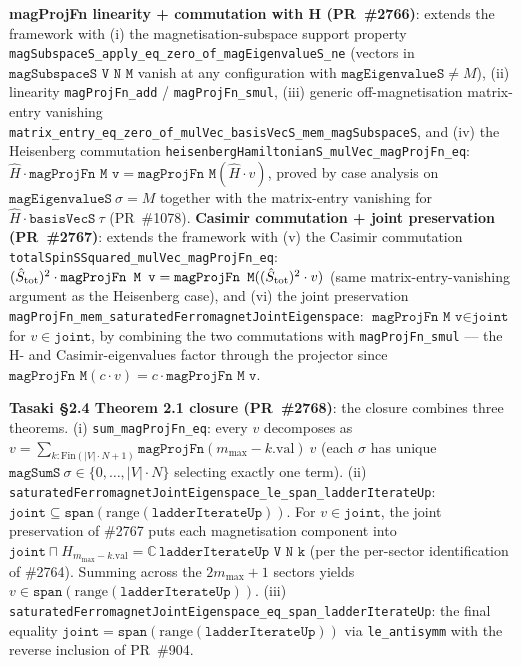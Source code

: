 \documentclass[a4paper,11pt]{article}
\begin{document}
\textbf{magProjFn linearity + commutation with H (PR~\#2766)}:
extends the framework with
(i) the magnetisation-subspace support property
\texttt{magSubspaceS\_apply\_eq\_zero\_of\_magEigenvalueS\_ne}
(vectors in $\texttt{magSubspaceS V N M}$ vanish at any
configuration with $\texttt{magEigenvalueS} \neq M$),
(ii) linearity \texttt{magProjFn\_add} / \texttt{magProjFn\_smul},
(iii) generic off-magnetisation matrix-entry vanishing
\texttt{matrix\_entry\_eq\_zero\_of\_mulVec\_basisVecS\_mem\_magSubspaceS},
and (iv) the Heisenberg commutation
\texttt{heisenbergHamiltonianS\_mulVec\_magProjFn\_eq}:
$\hat H \cdot \texttt{magProjFn M v} =
\texttt{magProjFn M} (\hat H \cdot v)$,
proved by case analysis on $\texttt{magEigenvalueS}~\sigma = M$
together with the matrix-entry vanishing for
$\hat H \cdot \texttt{basisVecS}~\tau$ (PR~\#1078). \textbf{Casimir commutation + joint preservation (PR~\#2767)}:
extends the framework with (v) the Casimir commutation
\texttt{totalSpinSSquared\_mulVec\_magProjFn\_eq}:
$(\hat S_{\rm tot})^2 \cdot \texttt{magProjFn M v} =
\texttt{magProjFn M} ((\hat S_{\rm tot})^2 \cdot v)$
(same matrix-entry-vanishing argument as the Heisenberg case),
and (vi) the joint preservation
\texttt{magProjFn\_mem\_saturatedFerromagnetJointEigenspace}:
$\texttt{magProjFn M v} \in \texttt{joint}$ for $v \in \texttt{joint}$,
by combining the two commutations with \texttt{magProjFn\_smul} —
the H- and Casimir-eigenvalues factor through the projector since
$\texttt{magProjFn M}(c \cdot v) = c \cdot \texttt{magProjFn M v}$.

\textbf{Tasaki §2.4 Theorem 2.1 closure (PR~\#2768)}:
the closure combines three theorems.
(i) \texttt{sum\_magProjFn\_eq}: every $v$ decomposes as
$v = \sum_{k : \mathrm{Fin}(|V|\cdot N + 1)}
\texttt{magProjFn}(m_{\max} - k.\textrm{val})~v$
(each $\sigma$ has unique $\texttt{magSumS}~\sigma \in \{0, \ldots,
|V|\cdot N\}$ selecting exactly one term).
(ii) \texttt{saturatedFerromagnetJointEigenspace\_le\_span\_ladderIterateUp}:
$\texttt{joint} \subseteq \texttt{span}(\mathrm{range}(\texttt{ladderIterateUp}))$.
For $v \in \texttt{joint}$, the joint preservation of \#2767 puts
each magnetisation component into
$\texttt{joint} \sqcap H_{m_{\max} - k.\textrm{val}} =
\mathbb{C}\,\texttt{ladderIterateUp V N k}$ (per the per-sector
identification of \#2764). Summing across the $2m_{\max}+1$ sectors
yields $v \in \texttt{span}(\mathrm{range}(\texttt{ladderIterateUp}))$.
(iii) \texttt{saturatedFerromagnetJointEigenspace\_eq\_span\_ladderIterateUp}:
the final equality $\texttt{joint} =
\texttt{span}(\mathrm{range}(\texttt{ladderIterateUp}))$ via
\texttt{le\_antisymm} with the reverse inclusion of PR~\#904.
\end{document}
